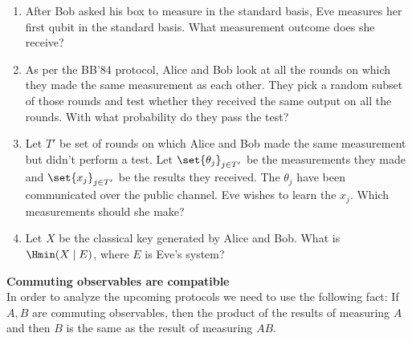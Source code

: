 \begin{exercises}
\begin{enumerate}
\item After Bob asked his box to measure in the standard basis, Eve measures her first qubit in the standard basis. What measurement outcome does she receive?
\item As per the BB'84 protocol, Alice and Bob look at all the rounds on which they made the same measurement as each other. They pick a random subset of those rounds and test whether they received the same output on all the rounds. With what probability do they pass the test?
\item Let $T'$ be set of rounds on which Alice and Bob made the same measurement but didn't perform a test. Let $\set{\theta_j}_{j\in T'}$ be the measurements they made and $\set{x_j}_{j\in T'}$ be the results they received. The $\theta_j$ have been communicated over the public channel. Eve wishes to learn the $x_j$. Which measurements should she make?
\item Let $X$ be the classical key generated by Alice and Bob. What is $\Hmin(X\mid E)$, where $E$ is Eve's system?
\end{enumerate}

\item {\bf Commuting observables are compatible}\\
In order to analyze the upcoming protocols we need to use the following fact:
If $A,B$ are commuting observables, then the product of the results of measuring $A$ and then $B$ is the same as the result of measuring $AB$.


\end{exercises}
